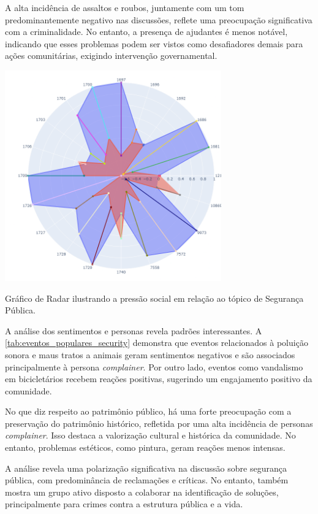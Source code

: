A alta incidência de assaltos e roubos, juntamente com um tom predominantemente negativo nas discussões, reflete uma preocupação significativa com a criminalidade. No entanto, a presença de ajudantes é menos notável, indicando que esses problemas podem ser vistos como desafiadores demais para ações comunitárias, exigindo intervenção governamental.

\begin{quadro}[htb]
	\centering
	\includegraphics[width=0.7\textwidth]{images/social_barometer_security.png}
	\caption{Gráfico de Radar ilustrando a pressão social em relação ao tópico de Segurança Pública.}
	\label{fig:social_barometer_security}
\end{quadro}

A análise dos sentimentos e personas revela padrões interessantes. A \autoref{tab:eventos_populares_security} demonstra que eventos relacionados à poluição sonora e maus tratos a animais geram sentimentos negativos e são associados principalmente à persona \textit{complainer}. Por outro lado, eventos como vandalismo em bicicletários recebem reações positivas, sugerindo um engajamento positivo da comunidade.

No que diz respeito ao patrimônio público, há uma forte preocupação com a preservação do patrimônio histórico, refletida por uma alta incidência de personas \textit{complainer}. Isso destaca a valorização cultural e histórica da comunidade. No entanto, problemas estéticos, como pintura, geram reações menos intensas.

A análise revela uma polarização significativa na discussão sobre segurança pública, com predominância de reclamações e críticas. No entanto, também mostra um grupo ativo disposto a colaborar na identificação de soluções, principalmente para crimes contra a estrutura pública e a vida.

